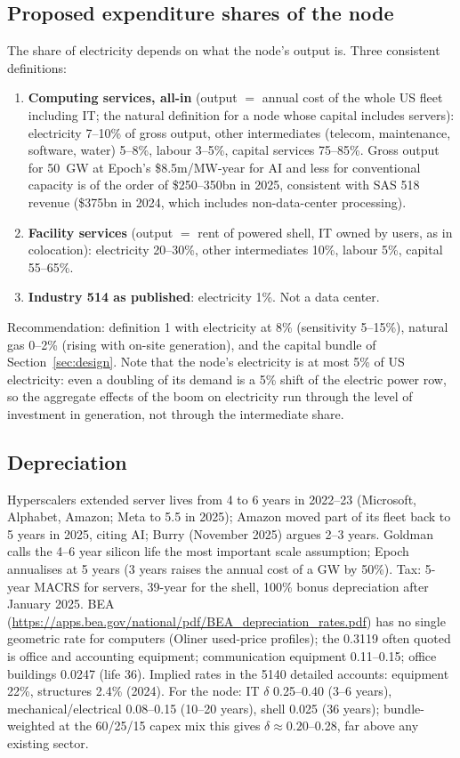\documentclass[11pt]{article}
\begin{document}
\subsection{Proposed expenditure shares of the node}
The share of electricity depends on what the node's output is. Three consistent definitions:
\begin{enumerate}
  \item \textbf{Computing services, all-in} (output $=$ annual cost of the whole US fleet including IT; the natural definition for a node whose capital includes servers): electricity 7--10\% of gross output, other intermediates (telecom, maintenance, software, water) 5--8\%, labour 3--5\%, capital services 75--85\%. Gross output for 50~GW at Epoch's \$8.5m/MW-year for AI and less for conventional capacity is of the order of \$250--350bn in 2025, consistent with SAS 518 revenue (\$375bn in 2024, which includes non-data-center processing).
  \item \textbf{Facility services} (output $=$ rent of powered shell, IT owned by users, as in colocation): electricity 20--30\%, other intermediates 10\%, labour 5\%, capital 55--65\%.
  \item \textbf{Industry 514 as published}: electricity 1\%. Not a data center.
\end{enumerate}
Recommendation: definition 1 with electricity at 8\% (sensitivity 5--15\%), natural gas 0--2\% (rising with on-site generation), and the capital bundle of Section~\ref{sec:design}. Note that the node's electricity is at most 5\% of US electricity: even a doubling of its demand is a 5\% shift of the electric power row, so the aggregate effects of the boom on electricity run through the level of investment in generation, not through the intermediate share.

\subsection{Depreciation}
Hyperscalers extended server lives from 4 to 6 years in 2022--23 (Microsoft, Alphabet, Amazon; Meta to 5.5 in 2025); Amazon moved part of its fleet back to 5 years in 2025, citing AI; Burry (November 2025) argues 2--3 years. Goldman calls the 4--6 year silicon life the most important scale assumption; Epoch annualises at 5 years (3 years raises the annual cost of a GW by 50\%). Tax: 5-year MACRS for servers, 39-year for the shell, 100\% bonus depreciation after January 2025. BEA (\url{https://apps.bea.gov/national/pdf/BEA_depreciation_rates.pdf}) has no single geometric rate for computers (Oliner used-price profiles); the 0.3119 often quoted is office and accounting equipment; communication equipment 0.11--0.15; office buildings 0.0247 (life 36). Implied rates in the 5140 detailed accounts: equipment 22\%, structures 2.4\% (2024). For the node: IT $\delta$ 0.25--0.40 (3--6 years), mechanical/electrical 0.08--0.15 (10--20 years), shell 0.025 (36 years); bundle-weighted at the 60/25/15 capex mix this gives $\delta \approx 0.20$--0.28, far above any existing sector.
\end{document}
